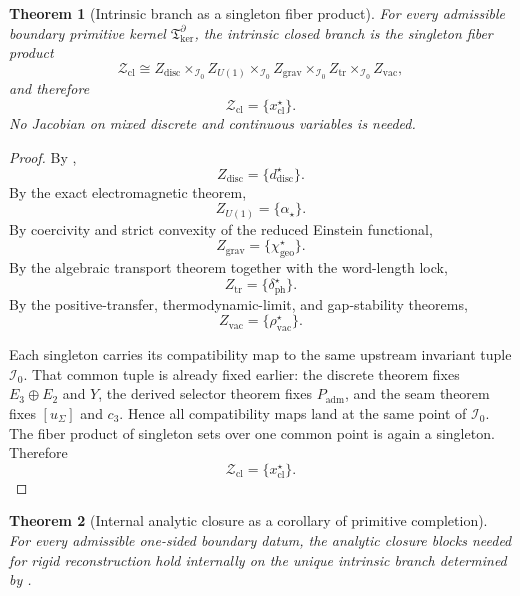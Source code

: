 \documentclass[11pt,a4paper]{article}
\newtheorem{theorem}{Theorem}[section]
\theoremstyle{definition}
\theoremstyle{remark}
\newcommand{\cthree}{c_3}
\newcommand{\chigeo}{\chi_{\mathrm{geo}}}
\newcommand{\Tker}{\mathfrak T_{\mathrm{ker}}}
\newcommand{\Padm}{P_{\mathrm{adm}}}
\begin{document}
\begin{theorem}[Intrinsic branch as a singleton fiber product]
\label{thm:intrinsic-closed-branch}
\label{thm:observation-closure}
\label{thm:singleton-fiber-product-branch}
For every admissible boundary primitive kernel $\Tker^\partial$, the intrinsic closed branch is the
singleton fiber product
\[
\mathcal Z_{\mathrm{cl}}
\cong
Z_{\mathrm{disc}}
\times_{\mathcal I_0}
Z_{U(1)}
\times_{\mathcal I_0}
Z_{\mathrm{grav}}
\times_{\mathcal I_0}
Z_{\mathrm{tr}}
\times_{\mathcal I_0}
Z_{\mathrm{vac}},
\]
and therefore
\[
\mathcal Z_{\mathrm{cl}}=\{x_{\mathrm{cl}}^\star\}.
\]
No Jacobian on mixed discrete and continuous variables is needed.
\end{theorem}

\begin{proof}
By ,
\[
Z_{\mathrm{disc}}=\{d^\star_{\mathrm{disc}}\}.
\]
By the exact electromagnetic theorem,
\[
Z_{U(1)}=\{\alpha_\star\}.
\]
By coercivity and strict convexity of the reduced Einstein functional,
\[
Z_{\mathrm{grav}}=\{\chigeo^\star\}.
\]
By the algebraic transport theorem together with the word-length lock,
\[
Z_{\mathrm{tr}}=\{\delta_{\mathrm{ph}}^\star\}.
\]
By the positive-transfer, thermodynamic-limit, and gap-stability theorems,
\[
Z_{\mathrm{vac}}=\{\rho_{\mathrm{vac}}^\star\}.
\]

Each singleton carries its compatibility map to the same upstream invariant tuple $\mathcal I_0$.
That common tuple is already fixed earlier: the discrete theorem fixes $E_3\oplus E_2$ and $Y$,
the derived selector theorem fixes $\Padm$, and the seam theorem fixes $[u_\Sigma]$ and $\cthree$.
Hence all compatibility maps land at the same point of $\mathcal I_0$. The fiber product of
singleton sets over one common point is again a singleton. Therefore
\[
\mathcal Z_{\mathrm{cl}}=\{x_{\mathrm{cl}}^\star\}.
\]
\end{proof}

\begin{theorem}[Internal analytic closure as a corollary of primitive completion]
\label{thm:internal-analytic-closure}
\label{thm:internal-analytic-closure-hard}
For every admissible one-sided boundary datum, the analytic closure blocks needed for rigid
reconstruction hold internally on the unique intrinsic branch determined by
.
\end{theorem}
\end{document}
